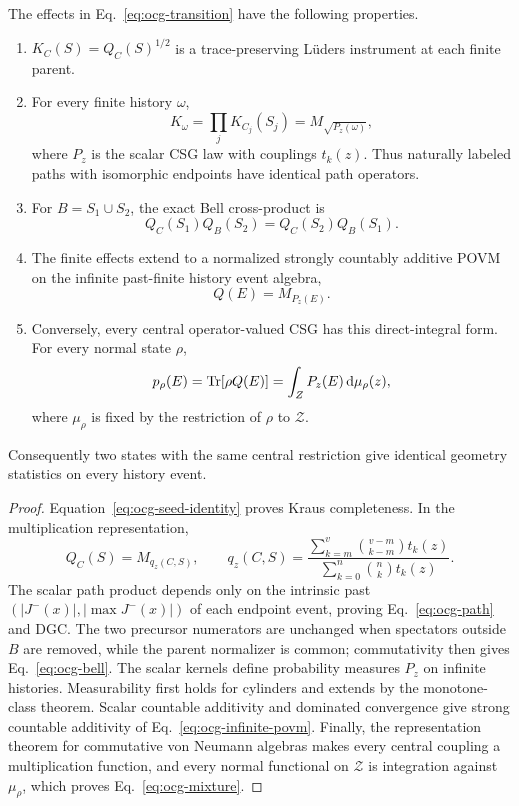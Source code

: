 \begin{theorem}
\label{thm:central-operator-growth-classification}
The effects in Eq.~\eqref{eq:ocg-transition} have the following
properties.
\begin{enumerate}
\item \(K_C(S)=Q_C(S)^{1/2}\) is a trace-preserving L\"uders instrument at
each finite parent.
\item For every finite history \(\omega\),
\begin{equation}
 K_\omega=\prod_jK_{C_j}(S_j)
 =M_{\sqrt{P_z(\omega)}} ,
 \label{eq:ocg-path}
\end{equation}
where \(P_z\) is the scalar CSG law with couplings \(t_k(z)\).  Thus
naturally labeled paths with isomorphic endpoints have identical path
operators.
\item For \(B=S_1\cup S_2\), the exact Bell cross-product is
\begin{equation}
 Q_C(S_1)Q_B(S_2)=Q_C(S_2)Q_B(S_1).
 \label{eq:ocg-bell}
\end{equation}
\item The finite effects extend to a normalized strongly countably
additive POVM on the infinite past-finite history event algebra,
\begin{equation}
 Q(E)=M_{P_z(E)}.
 \label{eq:ocg-infinite-povm}
\end{equation}
\item Conversely, every central operator-valued CSG has this direct-integral
form.  For every normal state \(\rho\),
\begin{equation}
 p_\rho(E)=\operatorname{Tr}[\rho Q(E)]
 =\int_ZP_z(E)\,\mathrm d\mu_\rho(z),
 \label{eq:ocg-mixture}
\end{equation}
where \(\mu_\rho\) is fixed by the restriction of \(\rho\) to
\(\mathcal Z\).
\end{enumerate}
Consequently two states with the same central restriction give identical
geometry statistics on every history event.
\end{theorem}

\begin{proof}
Equation~\eqref{eq:ocg-seed-identity} proves Kraus completeness.  In the
multiplication representation,
\[
 Q_C(S)=M_{q_z(C,S)},\qquad
 q_z(C,S)=
 \frac{\sum_{k=m}^{v}\binom{v-m}{k-m}t_k(z)}
 {\sum_{k=0}^{n}\binom nk t_k(z)} .
\]
The scalar path product depends only on the intrinsic past
\((|J^-(x)|,|\max J^-(x)|)\) of each endpoint event, proving
Eq.~\eqref{eq:ocg-path} and DGC.  The two precursor numerators are unchanged
when spectators outside \(B\) are removed, while the parent normalizer is
common; commutativity then gives Eq.~\eqref{eq:ocg-bell}.  The scalar
kernels define probability measures \(P_z\) on infinite histories.
Measurability first holds for cylinders and extends by the monotone-class
theorem.  Scalar countable additivity and dominated convergence give strong
countable additivity of Eq.~\eqref{eq:ocg-infinite-povm}.  Finally, the
representation theorem for commutative von Neumann algebras makes every
central coupling a multiplication function, and every normal functional on
\(\mathcal Z\) is integration against \(\mu_\rho\), which proves
Eq.~\eqref{eq:ocg-mixture}.
\end{proof}

